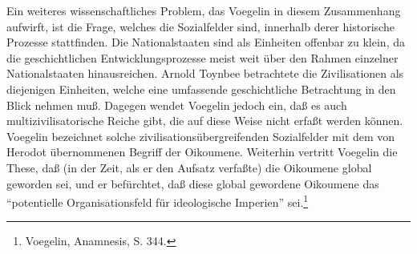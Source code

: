 Ein weiteres wissenschaftliches Problem, das Voegelin in diesem Zusammenhang
aufwirft, ist die Frage, welches die Sozialfelder sind, innerhalb derer
historische Prozesse stattfinden. Die Nationalstaaten sind als Einheiten
offenbar zu klein, da die geschichtlichen Entwicklungsprozesse meist weit über
den Rahmen einzelner Nationalstaaten hinausreichen. Arnold Toynbee betrachtete
die Zivilisationen als diejenigen Einheiten, welche eine umfassende
geschichtliche Betrachtung in den Blick nehmen muß. Dagegen wendet Voegelin
jedoch ein, daß es auch multizivilisatorische Reiche gibt, die auf diese Weise
nicht erfaßt werden können. Voegelin bezeichnet solche
zivilisationsübergreifenden Sozialfelder mit dem von Herodot übernommenen
Begriff der Oikoumene. Weiterhin vertritt Voegelin die These, daß (in der
Zeit, als er den Aufsatz verfaßte) die Oikoumene global geworden sei, und er
befürchtet, daß diese global gewordene Oikoumene das "`potentielle
Organisationsfeld für ideologische Imperien"' sei.\footnote{Voegelin,
  Anamnesis, S. 344.}


